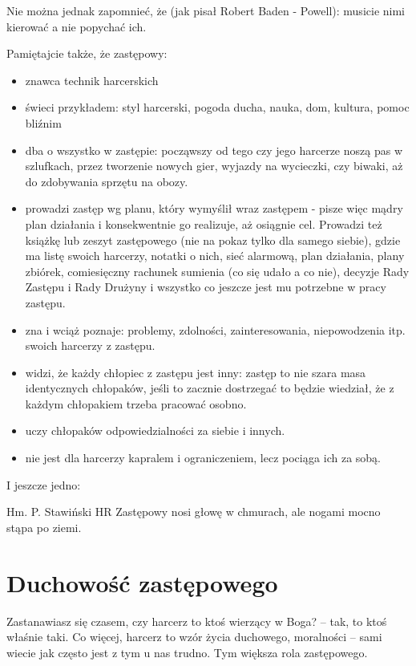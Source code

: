 Nie można jednak zapomnieć, że (jak pisał Robert Baden - Powell): musicie nimi kierować a nie popychać ich. 

\noindent
Pamiętajcie także, że zastępowy:
\begin{itemize}\itemsep1pt

\item znawca technik harcerskich
\item  świeci przykładem: styl harcerski, pogoda ducha, nauka, dom, kultura, pomoc bliźnim
\item  dba o wszystko w  zastępie:  począwszy od  tego czy jego harcerze noszą pas  w szlufkach, przez tworzenie nowych gier, wyjazdy na wycieczki, czy biwaki, aż do zdobywania sprzętu na obozy.
\item  prowadzi zastęp wg planu, który wymyślił wraz zastępem - pisze więc mądry plan działania i konsekwentnie go realizuje, aż osiągnie cel. Prowadzi też książkę lub zeszyt zastępowego (nie na  pokaz  tylko dla samego  siebie), gdzie ma listę swoich harcerzy, notatki o nich, sieć alarmową, plan działania, plany zbiórek, comiesięczny rachunek sumienia (co się udało a co nie), decyzje Rady Zastępu i Rady Drużyny i wszystko co jeszcze jest mu potrzebne w pracy zastępu.
\item  zna i wciąż poznaje: problemy, zdolności, zainteresowania, niepowodzenia itp. swoich harcerzy z zastępu.
\item   widzi, że każdy chłopiec z zastępu jest inny: zastęp to nie szara masa identycznych chłopaków, jeśli to zacznie dostrzegać to będzie wiedział,  że  z każdym chłopakiem trzeba pracować osobno.
\item  uczy chłopaków odpowiedzialności za siebie i  innych.
\item  nie jest dla harcerzy kapralem i ograniczeniem, lecz pociąga ich za sobą.
\end{itemize}

I jeszcze jedno:
\begin{aquote}{Hm. P. Stawiński HR}
Zastępowy  nosi  głowę  w chmurach, ale  nogami  mocno  stąpa  po  ziemi.
 \end{aquote}



\section{Duchowość zastępowego}

Zastanawiasz się czasem, czy harcerz to ktoś wierzący w Boga? – tak, to ktoś właśnie taki. Co więcej, harcerz to wzór życia duchowego, moralności – sami wiecie jak często jest z tym u nas trudno. Tym większa rola zastępowego.

